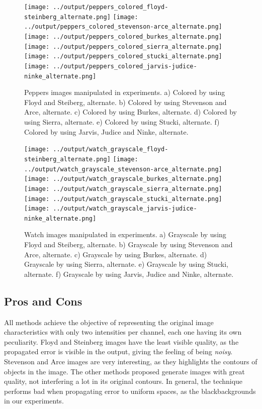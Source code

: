 \documentclass[]{IEEEtran}
\begin{document}
\begin{figure}[H]
  \centering
  \texttt{[image: ../output/peppers\_colored\_floyd-steinberg\_alternate.png]}
  \texttt{[image: ../output/peppers\_colored\_stevenson-arce\_alternate.png]}
  \texttt{[image: ../output/peppers\_colored\_burkes\_alternate.png]}
  \texttt{[image: ../output/peppers\_colored\_sierra\_alternate.png]}
  \texttt{[image: ../output/peppers\_colored\_stucki\_alternate.png]}
  \texttt{[image: ../output/peppers\_colored\_jarvis-judice-ninke\_alternate.png]}
  \caption{Peppers images manipulated in experiments. a) Colored by using Floyd and Steiberg, alternate. b) Colored by using Stevenson and Arce, alternate. c) Colored by using Burkes, alternate. d) Colored by using Sierra, alternate. e) Colored by using Stucki, alternate. f) Colored by using Jarvis, Judice and Ninke, alternate. }
  \label{fig:methods-peppers}
\end{figure}

 

\begin{figure}[H]
  \centering
  \texttt{[image: ../output/watch\_grayscale\_floyd-steinberg\_alternate.png]}
  \texttt{[image: ../output/watch\_grayscale\_stevenson-arce\_alternate.png]}
  \texttt{[image: ../output/watch\_grayscale\_burkes\_alternate.png]}
  \texttt{[image: ../output/watch\_grayscale\_sierra\_alternate.png]}
  \texttt{[image: ../output/watch\_grayscale\_stucki\_alternate.png]}
  \texttt{[image: ../output/watch\_grayscale\_jarvis-judice-ninke\_alternate.png]}
  \caption{Watch images manipulated in experiments. a) Grayscale by using Floyd and Steiberg, alternate. b) Grayscale by using Stevenson and Arce, alternate. c) Grayscale by using Burkes, alternate. d) Grayscale by using Sierra, alternate. e) Grayscale by using Stucki, alternate. f) Grayscale by using Jarvis, Judice and Ninke, alternate.}
  \label{fig:methods-watch}
\end{figure}

\subsection{Pros and Cons}
All methods achieve the objective of representing the original image characteristics with only two intensities per channel, each one having its own peculiarity. Floyd and Steinberg images have the least visible quality, as the propagated error is visible in the output, giving the feeling of being \textit{noisy}. Stevenson and Arce images are very interesting, as they highlights the contours of objects in the image. The other methods proposed generate images with great quality, not interfering a lot in its original contours. In general, the technique performs bad when propagating error to uniform spaces, as the blackbackgrounds in our experiments.
\end{document}
